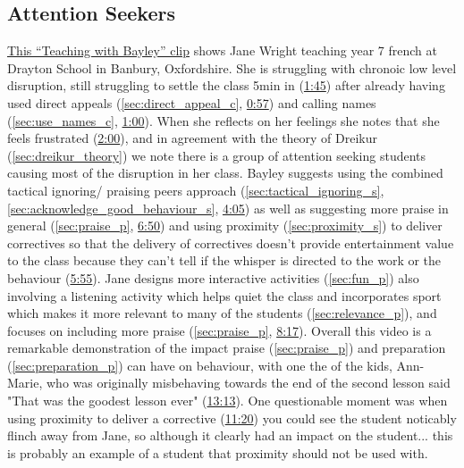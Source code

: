\documentclass[12pt]{report}
\begin{document}
\begin{appendices}
\section{Attention Seekers}
\label{video:5}

\href{https://www.youtube.com/watch?v=pXhtwDK4oHw}{This ``Teaching with Bayley'' clip} shows Jane Wright teaching year 7 french at Drayton School in Banbury, Oxfordshire. She is struggling with chronoic low level disruption, still struggling to settle the class 5min in (\href{https://www.youtube.com/watch?v=pXhtwDK4oHw&t=105}{1:45}) after already having used direct appeals (\ref{sec:direct_appeal_c}, \href{https://www.youtube.com/watch?v=pXhtwDK4oHw&t=57}{0:57}) and calling names (\ref{sec:use_names_c}, \href{https://www.youtube.com/watch?v=pXhtwDK4oHw&t=60}{1:00}). When she reflects on her feelings she notes that she feels frustrated (\href{https://www.youtube.com/watch?v=pXhtwDK4oHw&t=120}{2:00}), and in agreement with the theory of Dreikur (\ref{sec:dreikur_theory}) we note there is a group of attention seeking students causing most of the disruption in her class. Bayley suggests using the combined tactical ignoring/ praising peers approach (\ref{sec:tactical_ignoring_s}, \ref{sec:acknowledge_good_behaviour_s}, \href{https://www.youtube.com/watch?v=pXhtwDK4oHw&t=245}{4:05}) as well as suggesting more praise in general (\ref{sec:praise_p}, \href{https://www.youtube.com/watch?v=pXhtwDK4oHw&t=410}{6:50}) and using proximity (\ref{sec:proximity_s}) to deliver correctives so that the delivery of correctives doesn't provide entertainment value to the class because they can't tell if the whisper is directed to the work or the behaviour (\href{https://www.youtube.com/watch?v=pXhtwDK4oHw&t=355}{5:55}). Jane designs more interactive activities (\ref{sec:fun_p}) also involving a listening activity which helps quiet the class and incorporates sport which makes it more relevant to many of the students (\ref{sec:relevance_p}), and focuses on including more praise (\ref{sec:praise_p}, \href{https://www.youtube.com/watch?v=pXhtwDK4oHw&t=497}{8:17}). Overall this video is a remarkable demonstration of the impact praise (\ref{sec:praise_p}) and preparation (\ref{sec:preparation_p}) can have on behaviour, with one the of the kids, Ann-Marie, who was originally misbehaving towards the end of the second lesson said "That was the goodest lesson ever" (\href{https://www.youtube.com/watch?v=pXhtwDK4oHw&t=793}{13:13}). One questionable moment was when using proximity to deliver a corrective (\href{https://www.youtube.com/watch?v=pXhtwDK4oHw&t=680}{11:20}) you could see the student noticably flinch away from Jane, so although it clearly had an impact on the student... this is probably an example of a student that proximity should not be used with.









\end{appendices}
\end{document}
